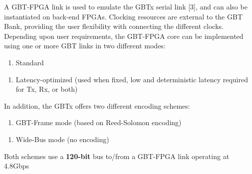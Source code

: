 A GBT-FPGA link is used to emulate the GBTx serial link [3], and can also be instantiated on back-end FPGAs. Clocking resources are external to the GBT Bank, providing the user flexibility with connecting the different clocks. Depending upon user requirements, the GBT-FPGA core can be implemented using one or more GBT links in two different modes:
\begin{enumerate}
\item Standard 
\end{enumerate}
\begin{enumerate}
\item Latency-optimized (used when fixed, low and deterministic latency required for Tx, Rx, or both)
\end{enumerate}
In addition, the GBTx offers two different encoding schemes:
\begin{enumerate}
\item GBT-Frame mode (based on Reed-Solomon encoding)
\end{enumerate}
\begin{enumerate}
\item Wide-Bus mode (no encoding)
\end{enumerate}
Both schemes use a \textbf{120-bit} bus to/from a GBT-FPGA link operating at 4.8Gbps

